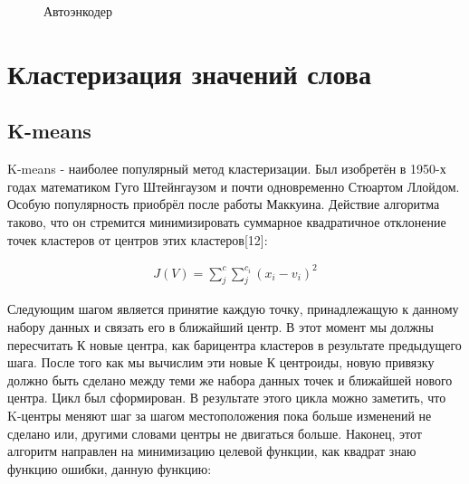 \documentclass[12pt]{article}
\begin{document}
  \begin{figure}[H]
    \noindent{}
    \caption{Автоэнкодер}
    \label{figCurves}
  \end{figure}

\section{Кластеризация значений слова}

\subsection{K-means}

K-means - наиболее популярный метод кластеризации. Был изобретён в 1950-х годах математиком Гуго Штейнгаузом и почти одновременно Стюартом Ллойдом. Особую популярность приобрёл после работы Маккуина. Действие алгоритма таково, что он стремится минимизировать суммарное квадратичное отклонение точек кластеров от центров этих кластеров[12]:

	\begin{align}
		J(V) = \sum_{j}^{c}\sum_{j}^{c_i}(x_i-v_i)^2
	\end{align}

Следующим шагом является принятие каждую точку, принадлежащую к данному набору данных и связать его в ближайший центр. В этот момент мы должны пересчитать К новые центра, как барицентра кластеров в результате предыдущего шага. После того как мы вычислим эти новые К центроиды, новую привязку должно быть сделано между теми же набора данных точек и ближайшей нового центра. Цикл был сформирован. В результате этого цикла можно заметить, что K-центры меняют шаг за шагом местоположения пока больше изменений не сделано или, другими словами центры не двигаться больше. Наконец, этот алгоритм направлен на минимизацию целевой функции, как квадрат знаю функцию ошибки, данную функцию:
\end{document}
